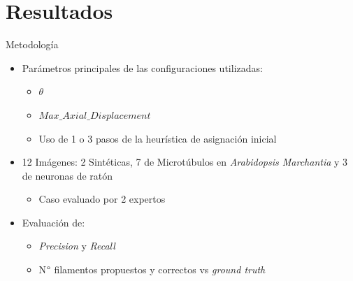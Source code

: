\section{Resultados}



\begin{frame}{Metodolog\'ia}
\begin{itemize}
    \item Par\'ametros principales de las configuraciones utilizadas:
        \begin{itemize}
            \item $\theta$
            \item $Max\_Axial\_Displacement$
            \item Uso de 1 o 3 pasos de la heur\'istica de asignaci\'on inicial
        \end{itemize}
    
    \item 12 Im\'agenes: 2 Sint\'eticas, 7 de Microt\'ubulos en {\it Arabidopsis Marchantia} y 3 de neuronas de rat\'on
    \begin{itemize}
        \item Caso evaluado por 2 expertos
    \end{itemize}
    
    \item Evaluaci\'on de:
        \begin{itemize}
            \item {\it Precision} y {\it Recall}
            \item N$\degree$ filamentos propuestos y correctos vs {\it ground truth}
        \end{itemize}
\end{itemize}
\end{frame}

